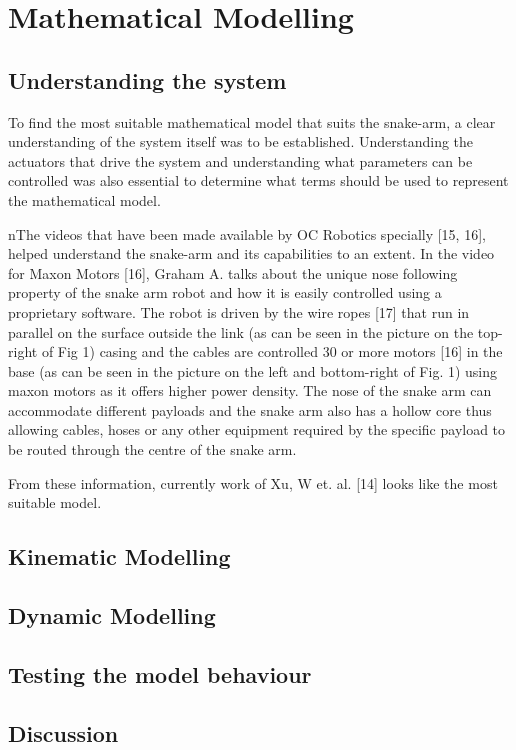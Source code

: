 \documentclass[a4paper,12pt]{report}
\begin{document}
\chapter{Mathematical Modelling}
\section{Understanding the system}
To find the most suitable mathematical model that suits the snake-arm, a clear understanding of the system itself was to be established. Understanding the actuators that drive the system and understanding what parameters can be controlled was also essential to determine what terms should be used to represent the mathematical model.

nThe videos that have been made available by OC Robotics specially [15, 16], helped understand the snake-arm and its capabilities to an extent. In the video for Maxon Motors [16], Graham A. talks about the unique nose following property of the snake arm robot and how it is easily controlled using a proprietary software. The robot is driven by the wire ropes [17] that run in parallel on the surface outside the link (as can be seen in the picture on the top-right of Fig 1) casing and the cables are controlled 30 or more motors [16] in the base (as can be seen in the picture on the left and bottom-right of Fig. 1) using maxon motors as it offers higher power density. The nose of the snake arm can accommodate different payloads and the snake arm also has a hollow core thus allowing cables, hoses or any other equipment required by the specific payload to be routed through the centre of the snake arm.

From these information, currently work of Xu, W et. al. [14] looks like the most suitable model. 

\section{Kinematic Modelling}
\section{Dynamic Modelling}
\section{Testing the model behaviour}
\section{Discussion}
\end{document}
